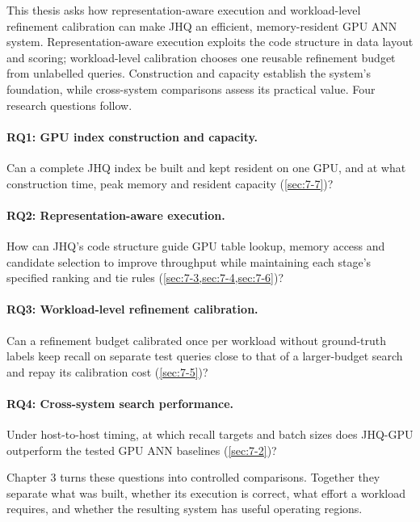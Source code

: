 This thesis asks how representation-aware execution and workload-level
refinement calibration can make JHQ an efficient, memory-resident GPU ANN
system. Representation-aware execution exploits the code structure in
data layout and scoring; workload-level calibration chooses one reusable
refinement budget from unlabelled queries. Construction and capacity
establish the system's foundation, while cross-system comparisons assess
its practical value. Four research questions follow.

\paragraph{RQ1: GPU index construction and capacity.}
Can a complete JHQ index be built and kept resident on one GPU, and at
what construction time, peak memory and resident capacity (\cref{sec:7-7})?

\paragraph{RQ2: Representation-aware execution.}
How can JHQ's code structure guide GPU table lookup, memory access and
candidate selection to improve throughput while maintaining each stage's
specified ranking and tie rules (\cref{sec:7-3,sec:7-4,sec:7-6})?

\paragraph{RQ3: Workload-level refinement calibration.}
Can a refinement budget calibrated once per workload without ground-truth
labels keep recall on separate test queries close to that of a larger-budget
search and repay its calibration cost (\cref{sec:7-5})?

\paragraph{RQ4: Cross-system search performance.}
Under host-to-host timing, at which recall targets and batch sizes does
JHQ-GPU outperform the tested GPU ANN baselines (\cref{sec:7-2})?

Chapter 3 turns these questions into controlled comparisons. Together they
separate what was built, whether its execution is correct, what effort a
workload requires, and whether the resulting system has useful operating
regions.
